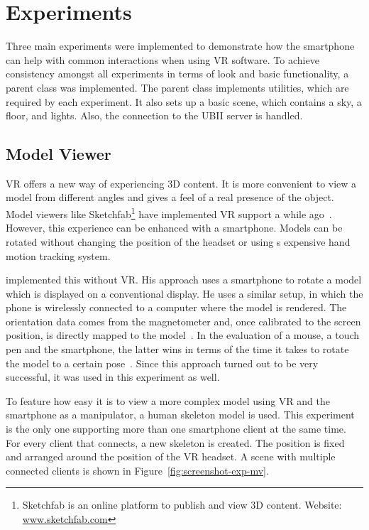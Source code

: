 \section{Experiments}\label{section:experiments}

Three main experiments were implemented to demonstrate how the smartphone can help with common interactions when using \ac{VR} software.
To achieve consistency amongst all experiments in terms of look and basic functionality, a parent class was implemented. The parent class implements utilities, which are required by each experiment. It also sets up a basic scene, which contains a sky, a floor, and lights. Also, the connection to the \ac{UBII} server is handled. 


\subsection{Model Viewer}\label{subsection:model-viewer}

\acl{VR} offers a new way of experiencing \ac{3D} content. It is more convenient to view a model from different angles and gives a feel of a real presence of the object. Model viewers like Sketchfab\footnote{Sketchfab is an online platform to publish and view \ac{3D} content. Website: \href{https://sketchfab.com}{www.sketchfab.com}} have implemented \ac{VR} support a while ago~\cite{Denoyel.2016}. However, this experience can be enhanced with a smartphone. Models can be rotated without changing the position of the headset or using s expensive hand motion tracking system.

\citeauthor{Katzakis.2010} implemented this without \ac{VR}. His approach uses a smartphone to rotate a model which is displayed on a conventional display. He uses a similar setup, in which the phone is wirelessly connected to a computer where the model is rendered. The orientation data comes from the magnetometer and, once calibrated to the screen position, is directly mapped to the model~\cite[139]{Katzakis.2010}. In the evaluation of a mouse, a touch pen and the smartphone, the latter wins in terms of the time it takes to rotate the model to a certain pose~\cite[140]{Katzakis.2010}. 
Since this approach turned out to be very successful, it was used in this experiment as well. 

To feature how easy it is to view a more complex model using VR and the smartphone as a manipulator, a human skeleton model is used. This experiment is the only one supporting more than one smartphone client at the same time. For every client that connects, a new skeleton is created. The position is fixed and arranged around the position of the \ac{VR} headset. A scene with multiple connected clients is shown in Figure~\ref{fig:screenshot-exp-mv}.


